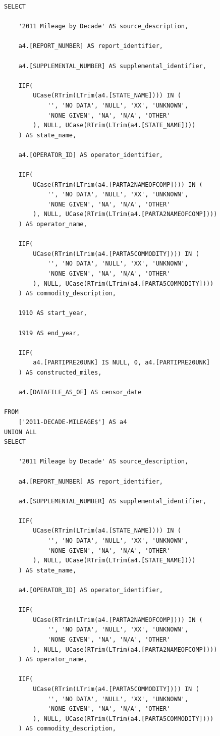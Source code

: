 \documentclass[letterpaper,10pt,oneside,final,onecolumn]{article}
\begin{document}
	\begin{lstlisting}[label=mileage-query,caption={\textit{JetSQL} statement to pivot pipeline mileage}]
SELECT

	'2011 Mileage by Decade' AS source_description,

	a4.[REPORT_NUMBER] AS report_identifier,

	a4.[SUPPLEMENTAL_NUMBER] AS supplemental_identifier,

	IIF(
		UCase(RTrim(LTrim(a4.[STATE_NAME]))) IN (
			'', 'NO DATA', 'NULL', 'XX', 'UNKNOWN',
			'NONE GIVEN', 'NA', 'N/A', 'OTHER'
		), NULL, UCase(RTrim(LTrim(a4.[STATE_NAME])))
	) AS state_name,

	a4.[OPERATOR_ID] AS operator_identifier,

	IIF(
		UCase(RTrim(LTrim(a4.[PARTA2NAMEOFCOMP]))) IN (
			'', 'NO DATA', 'NULL', 'XX', 'UNKNOWN',
			'NONE GIVEN', 'NA', 'N/A', 'OTHER'
		), NULL, UCase(RTrim(LTrim(a4.[PARTA2NAMEOFCOMP])))
	) AS operator_name,

	IIF(
		UCase(RTrim(LTrim(a4.[PARTA5COMMODITY]))) IN (
			'', 'NO DATA', 'NULL', 'XX', 'UNKNOWN',
			'NONE GIVEN', 'NA', 'N/A', 'OTHER'
		), NULL, UCase(RTrim(LTrim(a4.[PARTA5COMMODITY])))
	) AS commodity_description,

	1910 AS start_year,

	1919 AS end_year,

	IIF(
		a4.[PARTIPRE20UNK] IS NULL, 0, a4.[PARTIPRE20UNK]
	) AS constructed_miles,

	a4.[DATAFILE_AS_OF] AS censor_date

FROM
	['2011-DECADE-MILEAGE$'] AS a4
UNION ALL
SELECT

	'2011 Mileage by Decade' AS source_description,

	a4.[REPORT_NUMBER] AS report_identifier,

	a4.[SUPPLEMENTAL_NUMBER] AS supplemental_identifier,

	IIF(
		UCase(RTrim(LTrim(a4.[STATE_NAME]))) IN (
			'', 'NO DATA', 'NULL', 'XX', 'UNKNOWN',
			'NONE GIVEN', 'NA', 'N/A', 'OTHER'
		), NULL, UCase(RTrim(LTrim(a4.[STATE_NAME])))
	) AS state_name,

	a4.[OPERATOR_ID] AS operator_identifier,

	IIF(
		UCase(RTrim(LTrim(a4.[PARTA2NAMEOFCOMP]))) IN (
			'', 'NO DATA', 'NULL', 'XX', 'UNKNOWN',
			'NONE GIVEN', 'NA', 'N/A', 'OTHER'
		), NULL, UCase(RTrim(LTrim(a4.[PARTA2NAMEOFCOMP])))
	) AS operator_name,

	IIF(
		UCase(RTrim(LTrim(a4.[PARTA5COMMODITY]))) IN (
			'', 'NO DATA', 'NULL', 'XX', 'UNKNOWN',
			'NONE GIVEN', 'NA', 'N/A', 'OTHER'
		), NULL, UCase(RTrim(LTrim(a4.[PARTA5COMMODITY])))
	) AS commodity_description,


\end{lstlisting}
\end{document}
